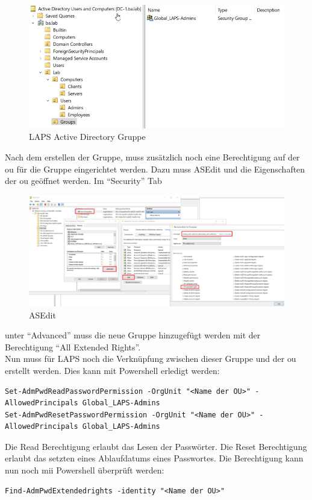 \begin{figure}[H]
    \centering
    \includegraphics[width=\linewidth]{../img/LAPS/Laps-Admins.png}
    \caption{LAPS Active Directory Gruppe}
\end{figure}

Nach dem erstellen der Gruppe, muss zusätzlich noch eine Berechtigung auf der \acrshort{ou} für die Gruppe eingerichtet werden.
Dazu muss ASEdit und die Eigenschaften der \acrshort{ou} geöffnet werden. Im ``Security'' Tab
\begin{figure}[H]
    \centering
    \includegraphics[width=0.7\linewidth]{../img/LAPS/ASEdit.png}
    \caption{ASEdit}
\end{figure}
unter ``Advanced'' muss die neue Gruppe hinzugefügt werden mit der Berechtigung ``All Extended Rights''.\\

Nun muss für LAPS noch die Verknüpfung zwischen dieser Gruppe und der \acrshort{ou} erstellt werden.
Dies kann mit Powershell erledigt werden:
\begin{lstlisting}
Set-AdmPwdReadPasswordPermission -OrgUnit "<Name der OU>" -AllowedPrincipals Global_LAPS-Admins
Set-AdmPwdResetPasswordPermission -OrgUnit "<Name der OU>" -AllowedPrincipals Global_LAPS-Admins
\end{lstlisting}
Die Read Berechtigung erlaubt das Lesen der Passwörter.
Die Reset Berechtigung erlaubt das setzten eines Ablaufdatums eines Passwortes.
Die Berechtigung kann nun noch mii Powershell überprüft werden:
\begin{lstlisting}
Find-AdmPwdExtendedrights -identity "<Name der OU>"
\end{lstlisting}


